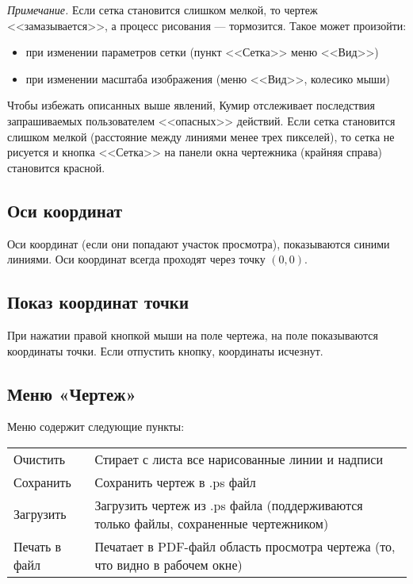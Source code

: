 \documentclass[12pt,a4paper]{article}
\begin{document}
\emph{Примечание.} Если сетка становится слишком мелкой, то чертеж <<замазывается>>, а процесс рисования --- тормозится. Такое может произойти:
\begin{itemize}
\item при изменении параметров сетки (пункт <<Сетка>> меню <<Вид>>)
\item при изменении масштаба изображения (меню <<Вид>>, колесико мыши)
\end{itemize}

Чтобы избежать описанных выше явлений, Кумир отслеживает последствия запрашиваемых пользователем <<опасных>> действий. Если сетка становится слишком мелкой (расстояние между линиями менее трех пикселей), то сетка не рисуется и кнопка <<Сетка>> на панели  окна чертежника (крайняя справа) становится красной.

\subsection{Оси координат}

Оси координат (если они попадают участок просмотра), показываются синими линиями. Оси координат всегда проходят через точку $(0,0)$.

\subsection{Показ координат точки}

При нажатии правой кнопкой мыши на поле чертежа, на поле показываются координаты точки. Если отпустить кнопку, координаты исчезнут.

\subsection[Меню ''Чертеж'']{Меню «Чертеж»}

Меню содержит следующие пункты:
\begin{center}
\begin{tabular}{||p{3cm}|p{12.5cm}||}
\hline
\hline
Очистить &
Стирает с листа все нарисованные линии и надписи\\
Сохранить &
Сохранить чертеж в .ps файл\\
Загрузить &
Загрузить чертеж из .ps файла (поддерживаются только файлы, сохраненные чертежником)\\
Печать в файл &
Печатает в PDF-файл область просмотра чертежа (то, что видно в рабочем окне)\\
\hline
\hline
\end{tabular}
\end{center}
\end{document}
